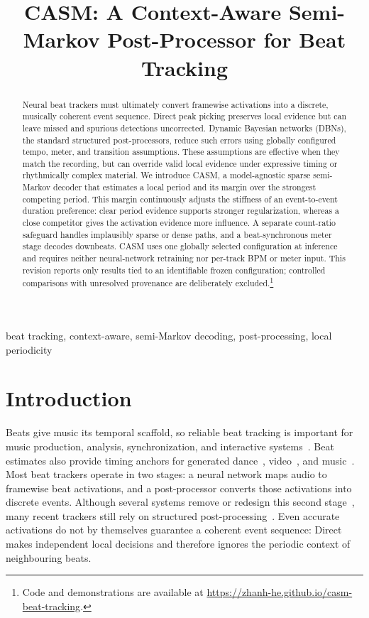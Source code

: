 \documentclass{article}
\title{CASM: A Context-Aware Semi-Markov Post-Processor for Beat Tracking}
\begin{document}
\ninept
\maketitle

\begin{abstract}
Neural beat trackers must ultimately convert framewise activations into a discrete, musically coherent event sequence. Direct peak picking preserves local evidence but can leave missed and spurious detections uncorrected. Dynamic Bayesian networks (DBNs), the standard structured post-processors, reduce such errors using globally configured tempo, meter, and transition assumptions. These assumptions are effective when they match the recording, but can override valid local evidence under expressive timing or rhythmically complex material. We introduce CASM, a model-agnostic sparse semi-Markov decoder that estimates a local period and its margin over the strongest competing period. This margin continuously adjusts the stiffness of an event-to-event duration preference: clear period evidence supports stronger regularization, whereas a close competitor gives the activation evidence more influence. A separate count-ratio safeguard handles implausibly sparse or dense paths, and a beat-synchronous meter stage decodes downbeats. CASM uses one globally selected configuration at inference and requires neither neural-network retraining nor per-track BPM or meter input. This revision reports only results tied to an identifiable frozen configuration; controlled comparisons with unresolved provenance are deliberately excluded.\footnote{Code and demonstrations are available at \url{https://zhanh-he.github.io/casm-beat-tracking}.}
\end{abstract}

\begin{keywords}
beat tracking, context-aware, semi-Markov decoding, post-processing, local periodicity
\end{keywords}

\section{Introduction}
\label{sec:intro}
Beats give music its temporal scaffold, so reliable beat tracking is important for music production, analysis, synchronization, and interactive systems~\cite{purwins2019deep}. Beat estimates also provide timing anchors for generated dance~\cite{tseng2023edge,huang2024beatit}, video~\cite{yu2023loris,tong2026vem}, and music~\cite{lan2024musicongen,chen2024musicldm}. Most beat trackers operate in two stages: a neural network maps audio to framewise beat activations, and a post-processor converts those activations into discrete events. Although several systems remove or redesign this second stage~\cite{chen2022postprocessingfree,foscarin2024beat,bolt2026reformulated}, many recent trackers still rely on structured post-processing~\cite{deng2024efficient,ru2025hingenet,ru2025beatfm,ru2026beatmamba,zhang2025beatkan}. Even accurate activations do not by themselves guarantee a coherent event sequence: Direct makes independent local decisions and therefore ignores the periodic context of neighbouring beats.
\end{document}
